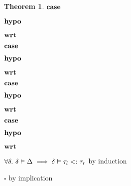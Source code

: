 \documentclass[acmsmall]{acmart}
\theoremstyle{definition}
\newtheorem{theorem}{Theorem}[section]
\begin{document}
\begin{theorem}
    \item \Z $\textbf{case } $
    \item \Z $\textbf{hypo } $
    \item \Z $\textbf{wrt } $
      \item \Z\Z {} 

    \item \Z $\textbf{case } $
    \item \Z $\textbf{hypo } $
    \item \Z $\textbf{wrt } $
      \item \Z\Z {} 

    \item \Z $\textbf{case } $
    \item \Z $\textbf{hypo } $
    \item \Z $\textbf{wrt } $

      \item \Z\Z {} 

    \item \Z $\textbf{case } $
    \item \Z $\textbf{hypo } $
    \item \Z $\textbf{wrt } $
      \item \Z\Z {} 

    \item \Z $\forall \delta .\ \delta \vDash \Delta \implies \delta \vDash \tau_l <: \tau_r$ 
    by induction
  \item $\square$ by implication
\end{theorem}
\end{document}
